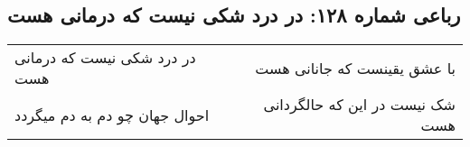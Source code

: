 \begin{center}
\section*{رباعی شماره ۱۲۸: در درد شکی نیست که درمانی هست}
\label{sec:sh128}
\begin{longtable}{l p{0.5cm} r}
در درد شکی نیست که درمانی هست
&&
با عشق یقینست که جانانی هست
\\
احوال جهان چو دم به دم میگردد
&&
شک نیست در این که حالگردانی هست
\\
\end{longtable}
\end{center}
